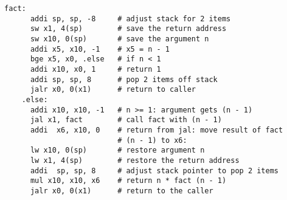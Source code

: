 \documentclass[varwidth, convert]{standalone}
\begin{document}
  \begin{BVerbatim}[gobble=4]
    fact:
      addi sp, sp, -8     # adjust stack for 2 items
      sw x1, 4(sp)        # save the return address
      sw x10, 0(sp)       # save the argument n
      addi x5, x10, -1    # x5 = n - 1
      bge x5, x0, .else   # if n < 1
      addi x10, x0, 1     # return 1
      addi sp, sp, 8      # pop 2 items off stack
      jalr x0, 0(x1)      # return to caller
    .else:
      addi x10, x10, -1   # n >= 1: argument gets (n - 1)
      jal x1, fact        # call fact with (n - 1)
      addi  x6, x10, 0    # return from jal: move result of fact
                          # (n - 1) to x6:
      lw x10, 0(sp)       # restore argument n
      lw x1, 4(sp)        # restore the return address
      addi  sp, sp, 8     # adjust stack pointer to pop 2 items
      mul x10, x10, x6    # return n * fact (n - 1)
      jalr x0, 0(x1)      # return to the caller
  \end{BVerbatim}
\end{document}
